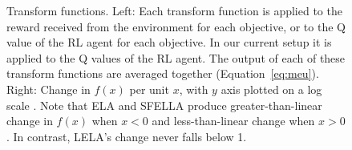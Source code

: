 \begin{figure}[h]
  \caption{Transform functions. Left: Each transform function is applied to the reward received from the environment for each objective, or to the Q value of the RL agent for each objective. In our current setup it is applied to the Q values of the RL agent.
  The output of each of these transform functions are averaged together %
  (Equation~\ref{eq:meu}). %
  Right: Change in $f(x)$ per unit $x$, with $y$ axis plotted on a log scale%
  . Note that ELA and SFELLA produce greater-than-linear change in $f(x)$ when $x<0$ and less-than-linear change when $x>0$. In contrast, LELA's change never falls below 1.}
  \label{fig:transform_functions}
\end{figure}

